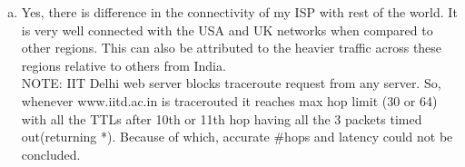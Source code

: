 \documentclass{article}
\begin{document}
\begin{enumerate}[a)]
        \item Yes, there is difference in the connectivity of my ISP with rest of the world. It is very well connected with the USA and UK networks when compared to other regions. This can also be attributed to the heavier traffic across these regions relative to others from India.\\
        NOTE: IIT Delhi web server blocks traceroute request from any server. So, whenever www.iitd.ac.in is tracerouted it reaches max hop limit (30 or 64) with all the TTLs after 10th or 11th hop having all the 3 packets timed out(returning *). Because of which, accurate \#hops and latency could not be concluded.
         
    \end{enumerate}{}
\end{document}

